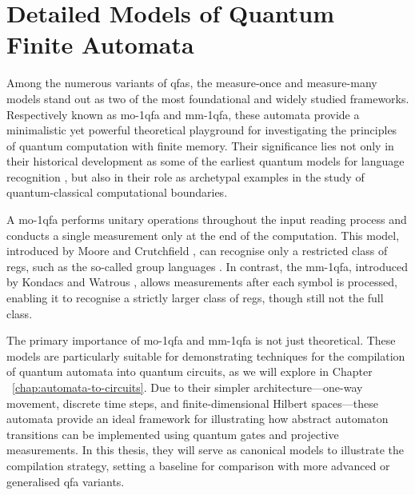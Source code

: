 \section{Detailed Models of Quantum Finite Automata}
\label{sec:detailed-models}
Among the numerous variants of \glspl{qfa}, the measure-once and measure-many models stand out as two of the most foundational and widely studied frameworks. Respectively known as \gls{mo-1qfa} and \gls{mm-1qfa}, these automata provide a minimalistic yet powerful theoretical playground for investigating the principles of quantum computation with finite memory. Their significance lies not only in their historical development as some of the earliest quantum models for language recognition \cite{moore2000quantum, kondacs1997power}, but also in their role as archetypal examples in the study of quantum-classical computational boundaries.

A \gls{mo-1qfa} performs unitary operations throughout the input reading process and conducts a single measurement only at the end of the computation. This model, introduced by Moore and Crutchfield \cite{moore2000quantum}, can recognise only a restricted class of \glspl{reg}, such as the so-called group languages \cite{brodsky2002characterizations}. In contrast, the \gls{mm-1qfa}, introduced by Kondacs and Watrous \cite{kondacs1997power}, allows measurements after each symbol is processed, enabling it to recognise a strictly larger class of \glspl{reg}, though still not the full class.

The primary importance of \gls{mo-1qfa} and \gls{mm-1qfa} is not just theoretical. These models are particularly suitable for demonstrating techniques for the compilation of quantum automata into quantum circuits, as we will explore in Chapter ~\ref{chap:automata-to-circuits}. Due to their simpler architecture—one-way movement, discrete time steps, and finite-dimensional Hilbert spaces—these automata provide an ideal framework for illustrating how abstract automaton transitions can be implemented using quantum gates and projective measurements. In this thesis, they will serve as canonical models to illustrate the compilation strategy, setting a baseline for comparison with more advanced or generalised \gls{qfa} variants.



